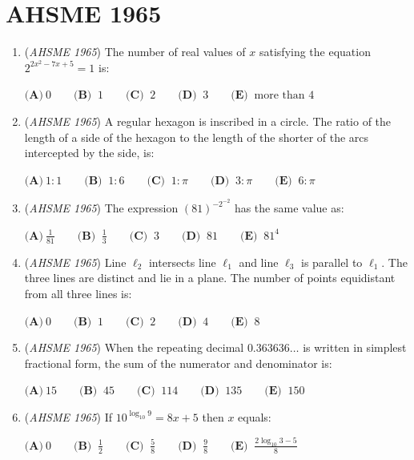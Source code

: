 \section{AHSME 1965}
        \begin{enumerate}
        	\item (\textit{AHSME 1965}) The number of real values of $x$ satisfying the equation $2^{2x^2 - 7x + 5} = 1$ is: 


 $\textbf{(A)}\ 0 \qquad  \textbf{(B) }\ 1 \qquad  \textbf{(C) }\ 2 \qquad  \textbf{(D) }\ 3 \qquad  \textbf{(E) }\ \text{more than 4}$


	\item (\textit{AHSME 1965}) A regular hexagon is inscribed in a circle. The ratio of the length of a side of the hexagon to the length of the 
shorter of the arcs intercepted by the side, is: 


 $\textbf{(A)}\ 1: 1 \qquad  \textbf{(B) }\ 1: 6 \qquad  \textbf{(C) }\ 1: \pi \qquad  \textbf{(D) }\ 3: \pi \qquad  \textbf{(E) }\ 6:\pi$


	\item (\textit{AHSME 1965}) The expression $(81)^{ - 2^{ - 2}}$ has the same value as: 


 $\textbf{(A)}\ \frac {1}{81} \qquad  \textbf{(B) }\ \frac {1}{3} \qquad  \textbf{(C) }\ 3 \qquad  \textbf{(D) }\ 81\qquad \textbf{(E) }\ 81^4$


	\item (\textit{AHSME 1965}) Line $\ell_2$ intersects line $\ell_1$ and line $\ell_3$ is parallel to $\ell_1$. The three lines are distinct and lie in a plane. 
The number of points equidistant from all three lines is: 


 $\textbf{(A)}\ 0 \qquad  \textbf{(B) }\ 1 \qquad  \textbf{(C) }\ 2 \qquad  \textbf{(D) }\ 4 \qquad  \textbf{(E) }\ 8$


	\item (\textit{AHSME 1965}) When the repeating decimal $0.363636\ldots$ is written in simplest fractional form, the sum of the numerator and denominator is: 


 $\textbf{(A)}\ 15 \qquad  \textbf{(B) }\ 45 \qquad  \textbf{(C) }\ 114 \qquad  \textbf{(D) }\ 135 \qquad  \textbf{(E) }\ 150$


	\item (\textit{AHSME 1965}) If $10^{\log_{10}9} = 8x + 5$ then $x$ equals: 


 $\textbf{(A)}\ 0 \qquad  \textbf{(B) }\ \frac {1}{2} \qquad  \textbf{(C) }\ \frac {5}{8} \qquad  \textbf{(D) }\ \frac{9}{8}\qquad \textbf{(E) }\ \frac{2\log_{10}3-5}{8}$



\end{enumerate}
